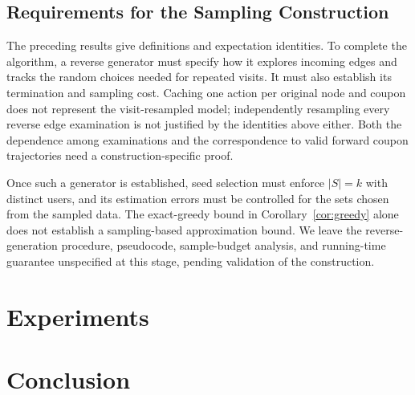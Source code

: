 \documentclass[sigconf]{acmart}
\begin{document}
\subsection{Requirements for the Sampling Construction}
\label{sec:reverse-requirements}

The preceding results give definitions and expectation identities.
To complete the algorithm, a reverse generator must specify how it
explores incoming edges and tracks the random choices needed for
repeated visits. It must also establish its termination and sampling
cost. Caching one action per original node and coupon does not
represent the visit-resampled model; independently resampling every
reverse edge examination is not justified by the identities above
either. Both the dependence among examinations and the correspondence
to valid forward coupon trajectories need a construction-specific
proof.

Once such a generator is established, seed selection must enforce
$|S|=k$ with distinct users, and its estimation errors must be
controlled for the sets chosen from the sampled data. The exact-greedy
bound in Corollary~\ref{cor:greedy} alone does not establish a
sampling-based approximation bound. We leave the reverse-generation
procedure, pseudocode, sample-budget analysis, and running-time
guarantee unspecified at this stage, pending validation of the
construction.



\section{Experiments}
\label{sec:exp}


\section{Conclusion}
\label{sec:conclusion}
\end{document}
